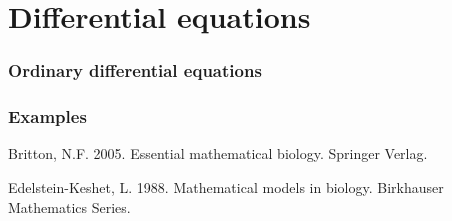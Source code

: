 






\part{Differential equations}
\section{Ordinary differential equations}


\section{Examples}

\begin{thebibliography}{}
Britton, N.F. 2005. Essential mathematical biology. Springer Verlag.

Edelstein-Keshet, L. 1988. Mathematical models in biology. Birkhauser Mathematics Series.

\end{thebibliography}






